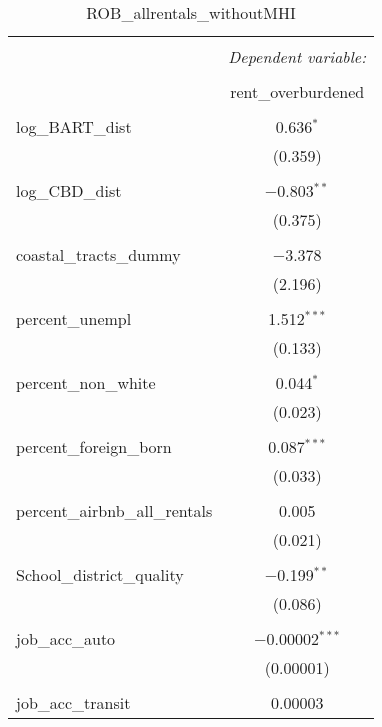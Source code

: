 \documentclass[10pt, letterpaper]{amsart}
\begin{document}
  

\begin{table}[!htbp] \centering 
  \caption{ROB\_allrentals\_withoutMHI} 
  \label{} 
  \begin{tabular}{@{\extracolsep{5pt}}lc} 
    \\[-1.8ex]\hline 
    \hline \\[-1.8ex] 
    & \multicolumn{1}{c}{\textit{Dependent variable:}} \\ 
    \cline{2-2} 
    \\[-1.8ex] & rent\_overburdened \\ 
    \hline \\[-1.8ex] 
    log\_BART\_dist & 0.636$^{*}$ \\ 
    & (0.359) \\ 
    & \\ 
    log\_CBD\_dist & $-$0.803$^{**}$ \\ 
    & (0.375) \\ 
    & \\ 
    coastal\_tracts\_dummy & $-$3.378 \\ 
    & (2.196) \\ 
    & \\ 
    percent\_unempl & 1.512$^{***}$ \\ 
    & (0.133) \\ 
    & \\ 
    percent\_non\_white & 0.044$^{*}$ \\ 
    & (0.023) \\ 
    & \\ 
    percent\_foreign\_born & 0.087$^{***}$ \\ 
    & (0.033) \\ 
    & \\ 
    percent\_airbnb\_all\_rentals & 0.005 \\ 
    & (0.021) \\ 
    & \\ 
    School\_district\_quality & $-$0.199$^{**}$ \\ 
    & (0.086) \\ 
    & \\ 
    job\_acc\_auto & $-$0.00002$^{***}$ \\ 
    & (0.00001) \\ 
    & \\ 
    job\_acc\_transit & 0.00003 \\ 

\end{tabular}
\end{table}
\end{document}
